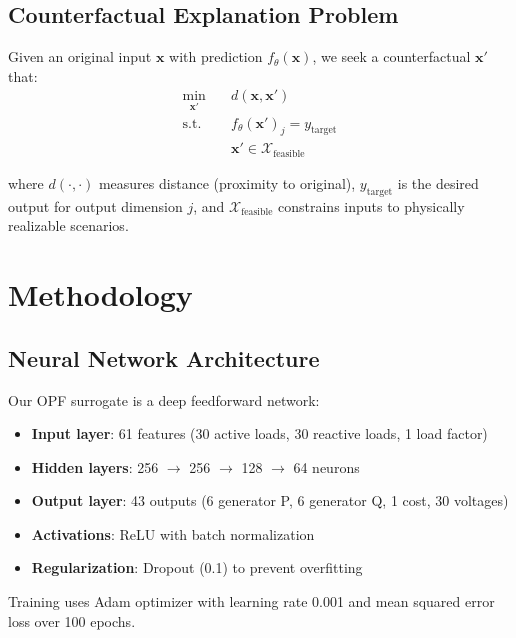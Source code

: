 \documentclass[journal,12pt,onecolumn]{IEEEtran}
\begin{document}
\subsection{Counterfactual Explanation Problem}

Given an original input $\mathbf{x}$ with prediction $f_\theta(\mathbf{x})$, we seek a counterfactual $\mathbf{x}'$ that:
\begin{align}
\min_{\mathbf{x}'} \quad & d(\mathbf{x}, \mathbf{x}') \label{eq:cf_obj}\\
\text{s.t.} \quad & f_\theta(\mathbf{x}')_j = y_{\text{target}} \\
& \mathbf{x}' \in \mathcal{X}_{\text{feasible}}
\end{align}

where $d(\cdot, \cdot)$ measures distance (proximity to original), $y_{\text{target}}$ is the desired output for output dimension $j$, and $\mathcal{X}_{\text{feasible}}$ constrains inputs to physically realizable scenarios.

\section{Methodology}
\label{sec:methodology}

\subsection{Neural Network Architecture}

Our OPF surrogate is a deep feedforward network:
\begin{itemize}
    \item \textbf{Input layer}: 61 features (30 active loads, 30 reactive loads, 1 load factor)
    \item \textbf{Hidden layers}: 256 $\rightarrow$ 256 $\rightarrow$ 128 $\rightarrow$ 64 neurons
    \item \textbf{Output layer}: 43 outputs (6 generator P, 6 generator Q, 1 cost, 30 voltages)
    \item \textbf{Activations}: ReLU with batch normalization
    \item \textbf{Regularization}: Dropout (0.1) to prevent overfitting
\end{itemize}

Training uses Adam optimizer with learning rate 0.001 and mean squared error loss over 100 epochs.
\end{document}
